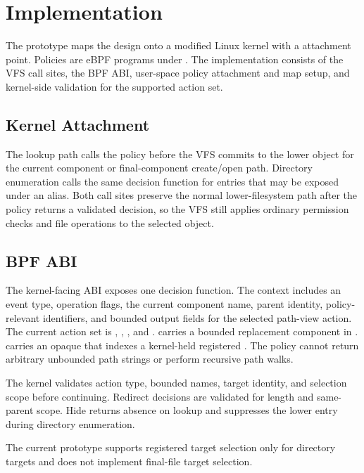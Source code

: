 \section{Implementation}
\label{sec:implementation}

The prototype maps the design onto a modified Linux kernel with a
 attachment point. Policies are eBPF programs under
. The implementation consists of the VFS call
sites, the BPF ABI, user-space policy attachment and map setup, and kernel-side
validation for the supported action set.

\subsection{Kernel Attachment}

The lookup path calls the policy before the VFS commits to the lower object for
the current component or final-component create/open path. Directory
enumeration calls the same decision function for entries that may be exposed
under an alias. Both call sites preserve the normal lower-filesystem path after
the policy returns a validated decision, so the VFS still applies ordinary
permission checks and file operations to the selected object.

\subsection{BPF ABI}

The kernel-facing ABI exposes one decision function. The context includes an
event type, operation flags, the current component name, parent identity,
policy-relevant identifiers, and bounded output fields for the selected
path-view action. The current action set is , ,
, and .  carries a bounded
replacement component in .  carries an
opaque  that indexes a kernel-held registered . The policy cannot return arbitrary unbounded path strings or perform
recursive path walks.

The kernel validates action type, bounded names, target identity, and selection
scope before continuing. Redirect decisions are validated for length and
same-parent scope. Hide returns absence on lookup and suppresses the lower
entry during directory enumeration.

The current prototype supports registered target selection only for directory
targets and does not implement final-file target selection.

